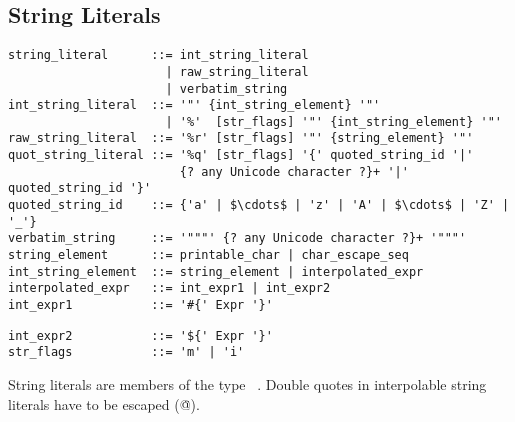 \subsection{String Literals}
\label{sec:stringliterals}

\syntax\begin{lstlisting}
string_literal      ::= int_string_literal
                      | raw_string_literal
                      | verbatim_string
int_string_literal  ::= '"' {int_string_element} '"'
                      | '%'  [str_flags] '"' {int_string_element} '"'
raw_string_literal  ::= '%r' [str_flags] '"' {string_element} '"'
quot_string_literal ::= '%q' [str_flags] '{' quoted_string_id '|'
                        {? any Unicode character ?}+ '|' quoted_string_id '}'
quoted_string_id    ::= {'a' | $\cdots$ | 'z' | 'A' | $\cdots$ | 'Z' | '_'}
verbatim_string     ::= '"""' {? any Unicode character ?}+ '"""'
string_element      ::= printable_char | char_escape_seq
int_string_element  ::= string_element | interpolated_expr
interpolated_expr   ::= int_expr1 | int_expr2
int_expr1           ::= '#{' Expr '}'
\end{lstlisting}
\begin{lstlisting}[mathescape=false]
int_expr2           ::= '${' Expr '}'
str_flags           ::= 'm' | 'i'
\end{lstlisting}

String literals are members of the type ~\lstinline@String@. Double quotes in interpolable string literals have to be escaped (\lstinline@\"@).

